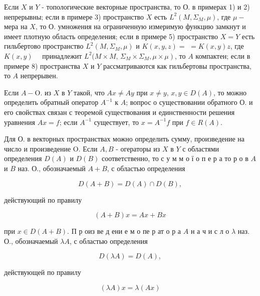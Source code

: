 \documentclass[10pt]{article}
\begin{document}
Если $X$ и $Y$ - топологические векторные пространства, то О. в примерах 1) и 2) непрерывны; если в примере 3) пространство $X$ есть $L^{2}\left(M, \Sigma_{M}, \mu\right)$, где $\mu-$ мера на $X$, то $О$. умножения на ограниченную измеримую функцию замкнут и имеет плотную область определения; если в примере 5) пространство $X=Y$ есть гильбертово пространство $L^{2}\left(M, \Sigma_{M}, \mu\right)$ и $K(x, y, z)=$ $=K(x, y) z$, где $K(x, y) \quad$ принадлежит $L^{2}(M \times M$, $\left.\Sigma_{M} \times \Sigma_{M}, \mu \times \mu\right)$, то $A$ компактен; если в примере 8) пространства $X$ и $Y$ рассматриваются как гильбертовы пространства, то $A$ непрерывен.



Если $A-\mathrm{O}$. из $X$ в $Y$ такой, что $A x \neq A y$ при $x \neq y$, $x, y \in D(A)$, то можно определить обратный оператор $A^{-1}$ к $A$; вопрос о существовании обратного О. и его свойствах связан с теоремой существования и единственности решения уравнения $A x=f$; если $A^{-1}$ существует, то $x=A^{-1} f$ при $f \in R(A)$.



Для О. в векторных пространствах можно определить сумму, произведение на число и произведение $\mathrm{O}$. Если $A, B$ - огераторы из $X$ в $Y$ с областями определения $D(A)$ и $D(B)$ соответственно, то с у м м о ї о п е р а то р о в $A$ и $B$ наз. О., обозначаемый $A+B$, с областью определения



\[

D(A+B)=D(A) \cap D(B),

\]



действующий по правилу



\[

(A+B) x=A x+B x

\]



при $x \in D(A+B)$. П р оиз ве д ени е м о пе р ат о р а $A$ н а ч и с л о $\lambda$ наз. О., обозначаемый $\lambda A$, с областью определения



\[

D(\lambda A)=D(A),

\]



действующей по правилу



\[

(\lambda A) x=\lambda(A x)

\]
\end{document}

